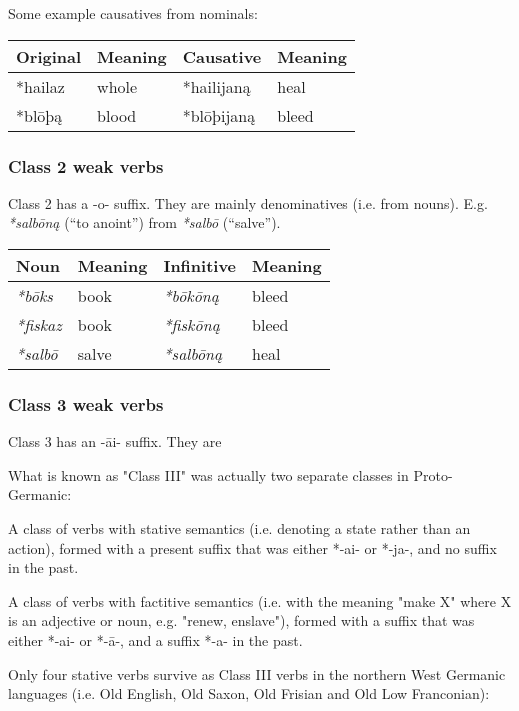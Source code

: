 \documentclass{article}
\begin{document}
Some example causatives from nominals:

\begin{center}
\begin{tabular}{| l l l l |}
\hline
Original & Meaning & Causative & Meaning \\
\hline
*hailaz & whole & *hailijaną & heal \\
*blōþą  & blood & *blōþijaną & bleed \\
\hline
\end{tabular}
\end{center}

\subsubsection{Class 2 weak verbs}

Class 2 has a -o- suffix. They are mainly denominatives (i.e. from nouns). E.g. \emph{ *salbōną} (``to anoint'') from \emph{*salbō} (``salve'').

\begin{center}
\begin{tabular}{| l l l l |}
\hline
Noun & Meaning & Infinitive & Meaning \\
\hline
\emph{*bōks}  & book & \emph{*bōkōną} & bleed \\
\emph{*fiskaz}  & book & \emph{*fiskōną} & bleed \\
\emph{*salbō} & salve & \emph{*salbōną} & heal \\
\hline
\end{tabular}
\end{center}

\subsubsection{Class 3 weak verbs}

Class 3 has an -āi- suffix. They are

What is known as "Class III" was actually two separate classes in Proto-Germanic:

A class of verbs with stative semantics (i.e. denoting a state rather than an action), formed with a present suffix that was either *-ai- or *-ja-, and no suffix in the past.

A class of verbs with factitive semantics (i.e. with the meaning "make X" where X is an adjective or noun, e.g. "renew, enslave"), formed with a suffix that was either *-ai- or *-ā-, and a suffix *-a- in the past.

Only four stative verbs survive as Class III verbs in the northern West Germanic languages (i.e. Old English, Old Saxon, Old Frisian and Old Low Franconian):
\end{document}
